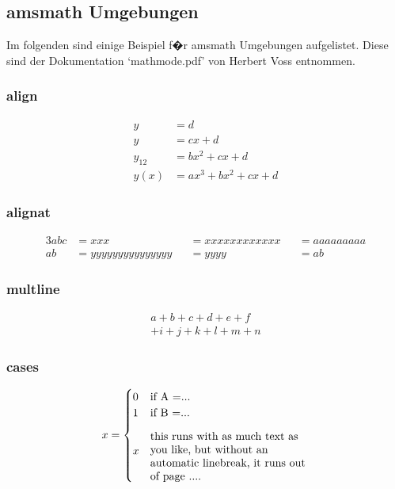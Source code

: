 \subsection{amsmath Umgebungen}

Im folgenden sind einige Beispiel f�r amsmath Umgebungen aufgelistet. Diese
sind der Dokumentation `mathmode.pdf' von Herbert Voss entnommen.

\subsubsection{align}
\begin{align}
   y      & = d                       \\
   y      & = cx + d                  \\
   y_{12} & = bx^{2} + cx + d         \\
   y(x)   & = ax^{3} + bx^{2}+ cx + d
\end{align}

\subsubsection{alignat}
\begin{alignat}{3}
   abc & = xxx             &  & = xxxxxxxxxxxx &  & = aaaaaaaaa \\
   ab  & = yyyyyyyyyyyyyyy &  & = yyyy         &  & = ab
\end{alignat}

\subsubsection{multline}

\begin{multline}
   a+b+c+d+e+f\\
   +i+j+k+l+m+n
\end{multline}

\subsubsection{cases}
\begin{equation}
   x = \begin{cases}
      0 & \text{if A =...}                                                                 \\
      1 & \text{if B =...}                                                                 \\
      x & \parbox{5 cm}{\flushleft this runs with as much text as you like, but without an
         automatic linebreak, it runs out of page ....}  %
   \end{cases}
\end{equation}

